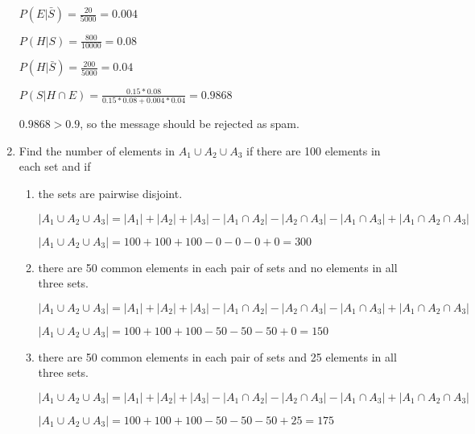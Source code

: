 \documentclass[12pt]{article}
\newenvironment{answer}{\larger[2]}{}
\begin{document}
\begin{enumerate}
\begin{answer}
$P(E|\bar{S}) = \frac{20}{5000} = 0.004$

$P(H|S) = \frac{800}{10000} = 0.08$

$P(H|\bar{S}) = \frac{200}{5000} = 0.04$

$P(S|H\cap E) = \frac{0.15*0.08}{0.15*0.08+0.004*0.04} = 0.9868$

$0.9868 > 0.9$, so the message should be rejected as spam.
\end{answer}

\vfill

\newpage



\item Find the number of elements in $A_1 \cup A_2 \cup A_3$ if there are 100 elements in each set and if

\begin{enumerate}
    \item the sets are pairwise disjoint.
    
    \begin{answer}
        $|A_1 \cup A_2 \cup A_3| = |A_1| + |A_2| + |A_3| - |A_1 \cap A_2| - |A_2 \cap A_3| - |A_1 \cap A_3| + |A_1 \cap A_2 \cap A_3|$

        $|A_1 \cup A_2 \cup A_3| = 100 + 100 + 100 - 0 - 0 - 0 + 0 = 300$
    \end{answer}

    \item there are 50 common elements in each pair of sets and no elements in all three sets.
    
    \begin{answer}
        $|A_1 \cup A_2 \cup A_3| = |A_1| + |A_2| + |A_3| - |A_1 \cap A_2| - |A_2 \cap A_3| - |A_1 \cap A_3| + |A_1 \cap A_2 \cap A_3|$

        $|A_1 \cup A_2 \cup A_3| = 100 + 100 + 100 - 50 - 50 - 50 + 0 = 150$
    \end{answer}

    \item there are 50 common elements in each pair of sets and 25 elements in all three sets.
    
    \begin{answer}
        $|A_1 \cup A_2 \cup A_3| = |A_1| + |A_2| + |A_3| - |A_1 \cap A_2| - |A_2 \cap A_3| - |A_1 \cap A_3| + |A_1 \cap A_2 \cap A_3|$

        $|A_1 \cup A_2 \cup A_3| = 100 + 100 + 100 - 50 - 50 - 50 + 25 = 175$
    \end{answer}
\end{enumerate}


\end{enumerate}
\end{document}
